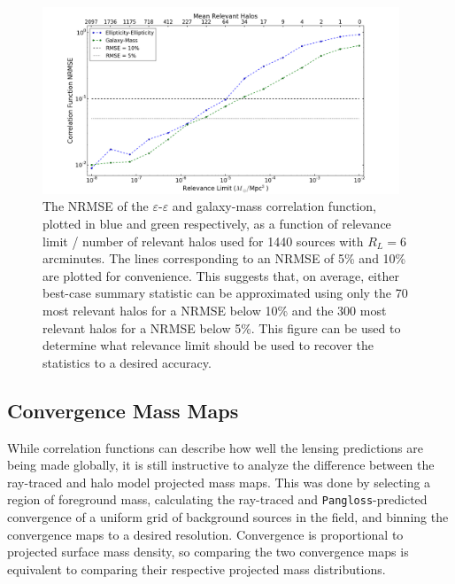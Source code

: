 \documentclass[%
 reprint,
 amsmath,amssymb,
 aps,nofootinbib
]{revtex4-1}
\begin{document}
\begin{figure}
    \centering
    \includegraphics[width=0.95\textwidth]{figs-swe/thesis/halo_fraction_long.png}
    \captionsetup{justification=raggedright,singlelinecheck=false}
    \caption{The NRMSE of the $\varepsilon$-$\varepsilon$ and galaxy-mass correlation function, plotted in blue and green respectively, as a function of relevance limit / number of relevant halos used for 1440 sources with $R_L=6$ arcminutes. The lines corresponding to an NRMSE of 5\% and 10\% are plotted for convenience. This suggests that, on average, either best-case summary statistic can be approximated using only the 70 most relevant halos for a NRMSE below 10\% and the 300 most relevant halos for a NRMSE below 5\%. This figure can be used to determine what relevance limit should be used to recover the statistics to a desired accuracy.}
    \label{fig:halo_fraction}
\end{figure}



\subsection{Convergence Mass Maps} \label{mass_maps}

While correlation functions can describe how well the lensing predictions are being made globally, it is still instructive to analyze the difference between the ray-traced and halo model projected mass maps. This was done by selecting a region of foreground mass, calculating the ray-traced and \texttt{Pangloss}-predicted convergence of a uniform grid of background sources in the field, and binning the convergence maps to a desired resolution. Convergence is proportional to projected surface mass density, so comparing the two convergence maps is equivalent to comparing their respective projected mass distributions.
\end{document}
